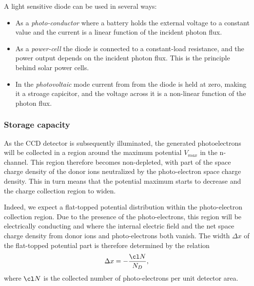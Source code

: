 A light sensitive diode can be used in several ways:
\begin{itemize}
\item As a {\it photo-conductor} where a battery holds the external voltage
  to a constant value and the current is a linear function of the
  incident photon flux.
\item As a {\it power-cell} the diode is connected to a constant-load
  resistance, and the power output depends on the incident photon
  flux. This is the principle behind solar power cells.
\item In the {\it photovoltaic} mode current from from the diode
  is held at zero, making it a stroage capicitor, and the voltage
  across it is a non-linear function of the photon flux.
\end{itemize}

\subsubsection{Storage capacity}

As the CCD detector is subsequently illuminated, the generated
photoelectrons will be collected in a region around the maximum
potential $V_{max}$ in the n-channel. This region therefore becomes
non-depleted, with part of the space charge density of the donor ions
neutralized by the photo-electron space charge density. This in turn
means that the potential maximum starts to decrease and the charge
collection region to widen. 

Indeed, we expect a flat-topped potential distribution within the
photo-electron collection region. Due to the presence of the
photo-electrons, this region will be electrically conducting and where
the internal electric field and the net space charge density
from donor ions and photo-electrons both vanish. The width $\Delta x$
of the flat-topped potential part is therefore determined by the
relation
\begin{equation}
  \Delta x = -\frac{\cl N}{N_D},
\end{equation}
where $\cl N$ is the collected number of photo-electrons per unit
detector area.

